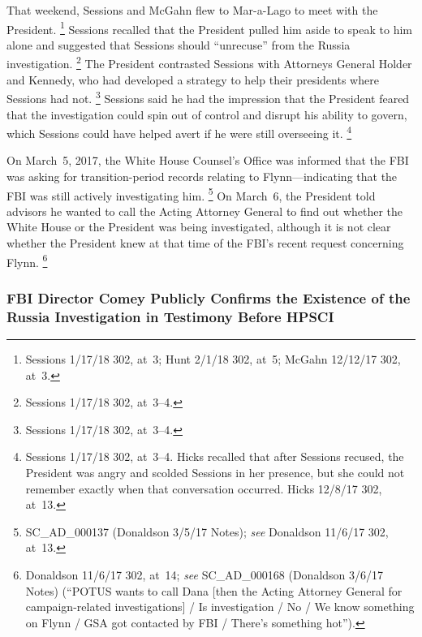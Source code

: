 That weekend, Sessions and McGahn flew to Mar-a-Lago to meet with the President.%
\footnote{Sessions 1/17/18 302, at~3;
Hunt 2/1/18 302, at~5;
McGahn 12/12/17 302, at~3.}
Sessions recalled that the President pulled him aside to speak to him alone and suggested that Sessions should ``unrecuse'' from the Russia investigation.%
\footnote{Sessions 1/17/18 302, at~3--4.}
The President contrasted Sessions with Attorneys General Holder and Kennedy, who had developed a strategy to help their presidents where Sessions had not.%
\footnote{Sessions 1/17/18 302, at~3--4.}
Sessions said he had the impression that the President feared that the investigation could spin out of control and disrupt his ability to govern, which Sessions could have helped avert if he were still overseeing it.%
\footnote{Sessions 1/17/18 302, at~3--4.
Hicks recalled that after Sessions recused, the President was angry and scolded Sessions in her presence, but she could not remember exactly when that conversation occurred.
Hicks 12/8/17 302, at~13.}

On March~5, 2017, the White House Counsel's Office was informed that the FBI was asking for transition-period records relating to Flynn---indicating that the FBI was still actively investigating him.%
\footnote{SC\_AD\_000137 (Donaldson 3/5/17 Notes);
\textit{see} Donaldson 11/6/17 302, at~13.}
On March~6, the President told advisors he wanted to call the Acting Attorney General to find out whether the White House or the President was being investigated, although it is not clear whether the President knew at that time of the FBI's recent request concerning Flynn.%
\footnote{Donaldson 11/6/17 302, at~14;
\textit{see} SC\_AD\_000168 (Donaldson 3/6/17 Notes) (``POTUS wants to call Dana [then the Acting Attorney General for campaign-related investigations] / Is investigation / No / We know something on Flynn / GSA got contacted by FBI / There's something hot'').}

\subsubsection{FBI Director Comey Publicly Confirms the Existence of the Russia Investigation in Testimony Before HPSCI}

